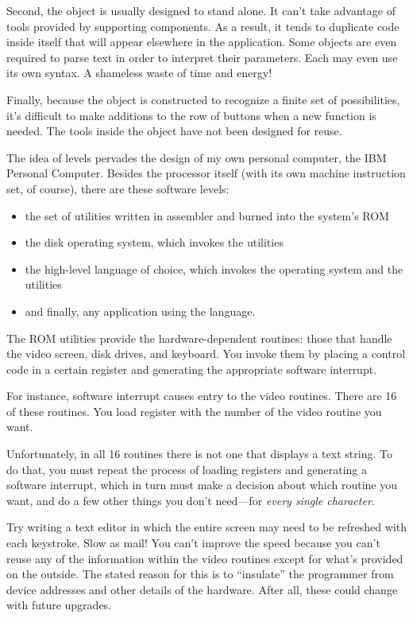 Second, the object is usually designed to stand alone. It can't take
advantage of tools provided by supporting components. As a result, it
tends to duplicate code inside itself that will appear elsewhere in
the application. Some objects are even required to parse text in order
to interpret their parameters. Each may even use its own syntax. A
shameless waste of time and energy!


Finally, because the object is constructed to recognize a finite set
of possibilities, it's difficult to make additions to the row of
buttons when a new function is needed. The tools inside the object
have not been designed for reuse.%

The idea of levels pervades the design of my own personal computer,
the IBM Personal Computer. Besides the processor itself (with its own
machine instruction set, of course), there are these software levels:

\begin{itemize}
\item the set of utilities written in assembler and burned into the
system's ROM
\item the disk operating system, which invokes the utilities
\item the high-level language of choice, which invokes the operating
system and the utilities
\item and finally, any application using the language.
\end{itemize}

\noindent The ROM utilities provide the hardware-dependent routines:
those that handle the video screen, disk drives, and keyboard. You
invoke them by placing a control code in a certain register and
generating the appropriate software interrupt.

For instance, software interrupt  causes entry to the video
routines. There are 16 of these routines. You load register  with
the number of the video routine you want.

Unfortunately, in all 16 routines there is not one that displays a text
string. To do that, you must repeat the process of loading registers and
generating a software interrupt, which in turn must make a decision
about which routine you want, and do a few other things you don't
need---for \emph{every single character}.

Try writing a text editor in which the entire screen may need to be
refreshed with each keystroke. Slow as mail! You can't improve the speed
because you can't reuse any of the information within the video routines
except for what's provided on the outside. The stated reason for this is to
``insulate'' the programmer from device addresses and other details of
the hardware. After all, these could change with future upgrades.

